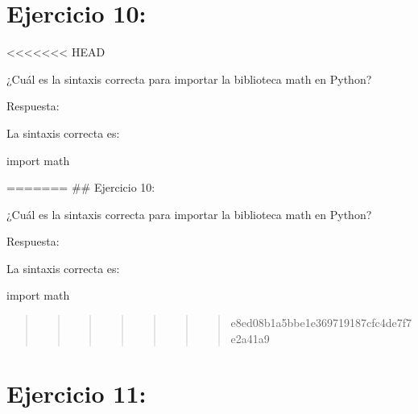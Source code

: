 \documentclass[
  a4paper,
  onepage,
  openany]{scrreprt}
\newenvironment{Shaded}{\begin{snugshade}}{\end{snugshade}}
\newcommand{\ImportTok}[1]{\textcolor[rgb]{0.00,0.46,0.62}{#1}}
\newcommand{\NormalTok}[1]{\textcolor[rgb]{0.00,0.23,0.31}{#1}}
\begin{document}
\hypertarget{ejercicio-10}{%
\chapter{Ejercicio 10:}\label{ejercicio-10}}

\textless\textless\textless\textless\textless\textless\textless{} HEAD

¿Cuál es la sintaxis correcta para importar la biblioteca math en
Python?

Respuesta:

La sintaxis correcta es:

\begin{Shaded}
\begin{Highlighting}[]
\ImportTok{import}\NormalTok{ math}
\end{Highlighting}
\end{Shaded}

======= \#\# Ejercicio 10:

¿Cuál es la sintaxis correcta para importar la biblioteca math en
Python?

Respuesta:

La sintaxis correcta es:

\begin{Shaded}
\begin{Highlighting}[]
\ImportTok{import}\NormalTok{ math}
\end{Highlighting}
\end{Shaded}

\begin{quote}
\begin{quote}
\begin{quote}
\begin{quote}
\begin{quote}
\begin{quote}
\begin{quote}
e8ed08b1a5bbe1e369719187cfc4de7f7e2a41a9
\end{quote}
\end{quote}
\end{quote}
\end{quote}
\end{quote}
\end{quote}
\end{quote}

\hypertarget{ejercicio-11}{%
\chapter{Ejercicio 11:}\label{ejercicio-11}}
\end{document}
